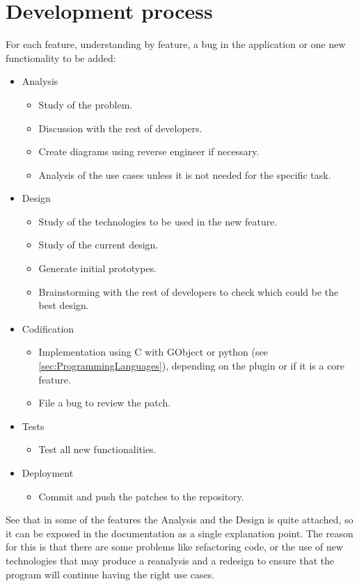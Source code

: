 
\chapter{Development process}


For each feature, understanding by feature, a bug in the application or one new functionality to be added:

\begin{itemize}
  \item Analysis
    \begin{itemize}
      \item Study of the problem.
      \item Discussion with the rest of developers.
      \item Create diagrams using reverse engineer if necessary.
      \item Analysis of the use cases unless it is not needed for the specific task.
    \end{itemize}
  \item Design
    \begin{itemize}
      \item Study of the technologies to be used in the new feature.
      \item Study of the current design.
      \item Generate initial prototypes.
      \item Brainstorming with the rest of developers to check which could be the best design.
    \end{itemize}
  \item Codification
    \begin{itemize}
      \item Implementation using C with GObject or python (see \ref{sec:ProgrammingLanguages}), depending on the plugin or if it is a core feature.
      \item File a bug to review the patch.
    \end{itemize}
  \newpage
  \item Tests
    \begin{itemize}
      \item Test all new functionalities.
    \end{itemize}
  \item Deployment
    \begin{itemize}
      \item Commit and push the patches to the \GNOME repository.
    \end{itemize}
\end{itemize}

See that in some of the features the Analysis and the Design is quite attached, so it can be exposed in the documentation as a single explanation point. The reason for this is that there are some problems like refactoring code, or the use of new technologies that may produce a reanalysis and a redesign to ensure that the program will continue having the right use cases.
